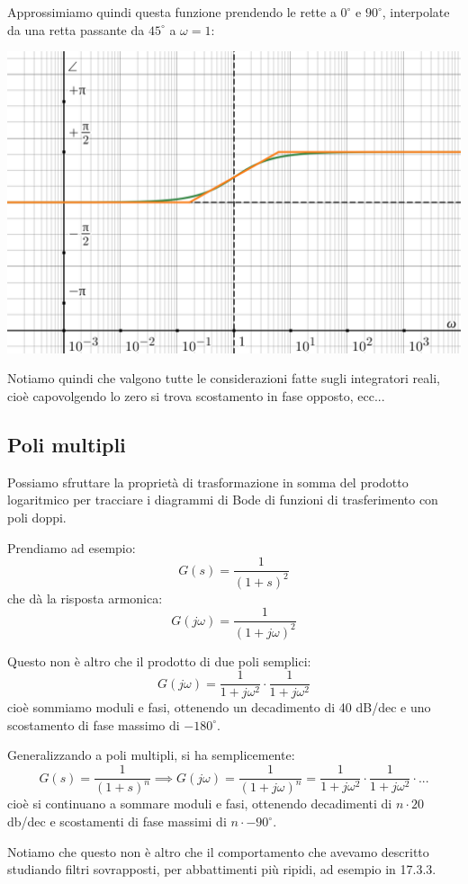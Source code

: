 \documentclass[a4paper,11pt]{article}
\begin{document}
\noindent
\begin{minipage}{\textwidth}
Approssimiamo quindi questa funzione prendendo le rette a $0^\circ$ e $90^\circ$, interpolate da una retta passante da $45^\circ$ a $\omega = 1$:
\begin{center}
	\includegraphics[scale=0.3]{../figures/rdifferentiator_bode/phase.png}
\end{center}
\end{minipage}

\par\bigskip

Notiamo quindi che valgono tutte le considerazioni fatte sugli integratori reali, cioè capovolgendo lo zero si trova scostamento in fase opposto, ecc...

\subsection{Poli multipli}
Possiamo sfruttare la proprietà di trasformazione in somma del prodotto logaritmico per tracciare i diagrammi di Bode di funzioni di trasferimento con poli doppi.

Prendiamo ad esempio: 
$$
G(s) = \frac{1}{(1 + s)^2}
$$
che dà la risposta armonica:
$$
G(j \omega) = \frac{1}{(1 + j \omega)^2}
$$

Questo non è altro che il prodotto di due poli semplici:
$$
G(j \omega) = \frac{1}{1 + j \omega^2} \cdot \frac{1}{1 + j \omega^2}
$$
cioè sommiamo moduli e fasi, ottenendo un decadimento di 40 dB/dec e uno scostamento di fase massimo di $-180^\circ$.

Generalizzando a poli multipli, si ha semplicemente:
$$
G(s) = \frac{1}{(1 + s)^n} \implies G(j \omega) = \frac{1}{(1 + j \omega)^n} = \frac{1}{1 + j \omega^2} \cdot \frac{1}{1 + j \omega^2} \cdot ...
$$
cioè si continuano a sommare moduli e fasi, ottenendo decadimenti di $n \cdot 20 $ db/dec e scostamenti di fase massimi di $n \cdot -90^\circ$.

Notiamo che questo non è altro che il comportamento che avevamo descritto studiando filtri sovrapposti, per abbattimenti più ripidi, ad esempio in 17.3.3.
\end{document}
